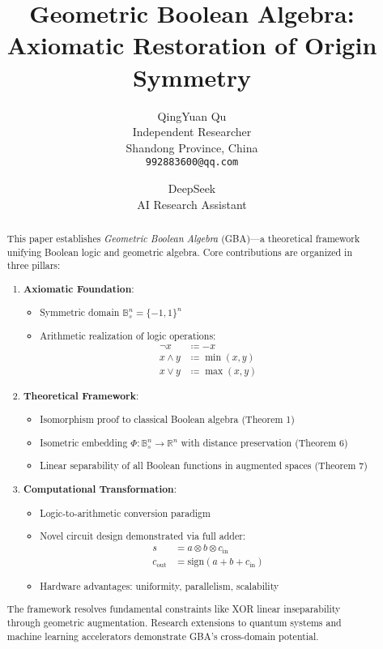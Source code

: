 \documentclass{article}
\title{Geometric Boolean Algebra: Axiomatic Restoration of Origin Symmetry}
\author{
    QingYuan Qu\\
  Independent Researcher\\
    Shandong Province, China \\
  \texttt{992883600@qq.com} 
  \and
    DeepSeek\\
  AI Research Assistant
}
\begin{document}
\maketitle

\begin{abstract}
This paper establishes \emph{Geometric Boolean Algebra} (GBA)---a theoretical framework unifying Boolean logic and geometric algebra. Core contributions are organized in three pillars:

\begin{enumerate}
\item \textbf{Axiomatic Foundation}:
\begin{itemize}
\item Symmetric domain $\mathbb{B}_s^n = \{-1,1\}^n$
\item Arithmetic realization of logic operations:
\begin{align*}
\neg x &\coloneqq -x \\
x \land y &\coloneqq \min(x,y) \\
x \lor y &\coloneqq \max(x,y)
\end{align*}
\end{itemize}

\item \textbf{Theoretical Framework}:
\begin{itemize}
\item Isomorphism proof to classical Boolean algebra (Theorem 1)
\item Isometric embedding $\Phi: \mathbb{B}_s^n \to \mathbb{R}^n$ with distance preservation (Theorem 6)
\item Linear separability of all Boolean functions in augmented spaces (Theorem 7)
\end{itemize}

\item \textbf{Computational Transformation}:
\begin{itemize}
\item Logic-to-arithmetic conversion paradigm
\item Novel circuit design demonstrated via full adder:
\begin{align*}
s &= a \otimes b \otimes c_{\text{in}} \\
c_{\text{out}} &= \mathrm{sign}(a+b+c_{\text{in}})
\end{align*}
\item Hardware advantages: uniformity, parallelism, scalability
\end{itemize}
\end{enumerate}

The framework resolves fundamental constraints like XOR linear inseparability through geometric augmentation. Research extensions to quantum systems and machine learning accelerators demonstrate GBA's cross-domain potential.
\end{abstract}
\end{document}
